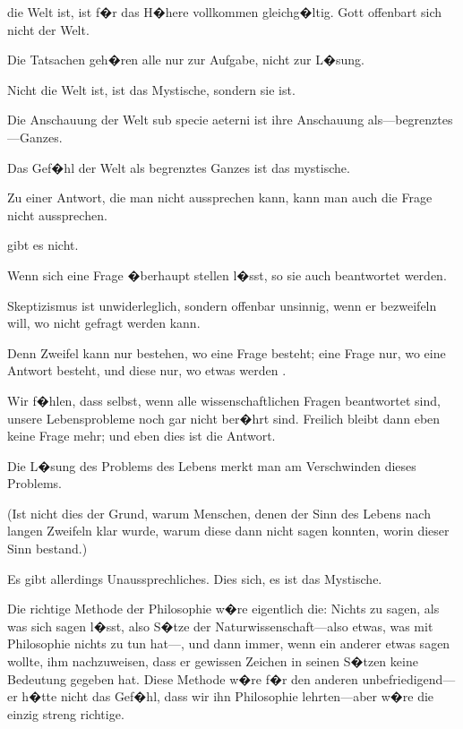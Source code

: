 { die Welt ist, ist f�r das H�here vollkommen
\enlargethispage{1pt} %
gleichg�ltig. Gott offenbart sich nicht 
der Welt.}


{Die Tatsachen geh�ren alle nur zur Aufgabe,
nicht zur L�sung.}


{Nicht  die Welt ist, ist das Mystische,
sondern  sie ist.}


{Die Anschauung der Welt sub specie aeterni
ist ihre Anschauung als---be\-grenz\-tes---Gan\-zes.

Das Gef�hl der Welt als begrenztes Ganzes ist
das mystische.}


{Zu einer Antwort, die man nicht aussprechen
kann, kann man auch die Frage nicht aussprechen.

 gibt es nicht.

Wenn sich eine Frage �berhaupt stellen l�sst,
so  sie auch beantwortet werden.}


{Skeptizismus ist  unwiderleglich, sondern
offenbar unsinnig, wenn er bezweifeln will, wo
nicht gefragt werden kann.

Denn Zweifel kann nur bestehen, wo eine Frage
besteht; eine Frage nur, wo eine Antwort besteht,
und diese nur, wo etwas  werden .}


{Wir f�hlen, dass selbst, wenn alle 
wissenschaftlichen Fragen beantwortet sind, unsere
Lebensprobleme noch gar nicht ber�hrt sind.
Freilich bleibt dann eben keine Frage mehr; und
eben dies ist die Antwort.}


{Die L�sung des Problems des Lebens merkt
man am Verschwinden dieses Problems.

(Ist nicht dies der Grund, warum Menschen,
denen der Sinn des Lebens nach langen Zweifeln
klar wurde, warum diese dann nicht sagen konnten,
worin dieser Sinn bestand.)}


{Es gibt allerdings Unaussprechliches. Dies
 sich, es ist das Mystische.}


{{\verystretchyspace
Die richtige Methode der Philosophie w�re
eigentlich die: Nichts zu sagen, als was sich sagen
l�sst, also S�tze der Na\-tur\-wis\-sen\-schaft---also etwas,
was mit Philosophie nichts zu tun hat---, und dann
immer, wenn ein anderer etwas 
sagen wollte, ihm nachzuweisen, dass er gewissen
Zeichen in seinen S�tzen keine Bedeutung gegeben
hat. Diese Methode w�re f�r den anderen un\-be\-frie\-di\-gend---er
h�tte nicht das Gef�hl, dass wir
ihn Philosophie lehrten---aber  w�re die einzig
streng richtige.}}


